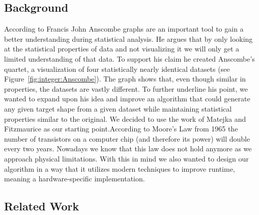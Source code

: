 \documentclass[sigconf]{acmart}
\begin{document}
\subsection{Background}
According to Francis John Anscombe graphs are an important tool to gain a better understanding during statistical analysis\cite{doi:10.1080/00031305.1973.10478966}. He argues that by only looking at the statistical properties
of data and not visualizing it we will only get a limited understanding of that data. To support his claim he created Anscombe's quartet, a visualization of four statistically  nearly identical datasets (see Figure~\ref*{fig:integer:Anscombe}). 
The graph shows that, even though similar in properties, the datasets are vastly different. To further underline his point, we wanted to expand upon his idea and improve an algorithm that could generate any given target shape from a given dataset 
while maintaining statistical properties similar to the original. We decided to use the work of Matejka and Fitzmaurice\cite{10.1145/3025453.3025912} as our starting point.\newline\newline According to Moore's Law from 1965 the number of
transistors on a computer chip (and therefore its power) will double every two years\cite{moore1965cramming}. Nowadays we know that this law does not hold anymore as we approach physical limitations. With this in mind we also wanted to design our
algorithm in a way that it utilizes modern techniques to improve runtime, meaning a hardware-specific implementation.


\subsection{Related Work}
\end{document}
